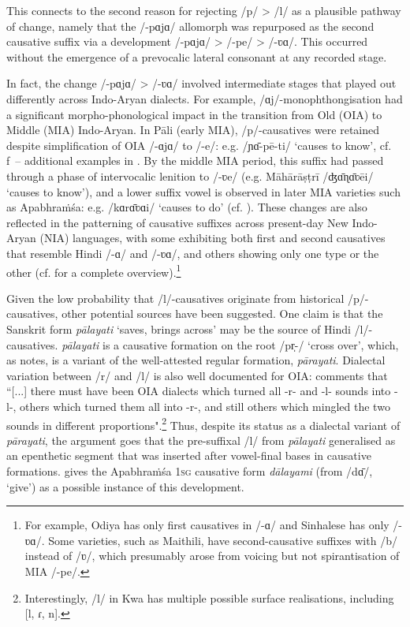 \documentclass[output=paper,colorlinks,citecolor=brown]{langscibook}
\begin{document}
This connects to the second reason for rejecting /p/ > /l/ as a plausible pathway of change, namely that the /-pɑjɑ/ allomorph was repurposed as the second causative suffix via a development /-pɑjɑ/ > /-pe/ > /-ʋɑ/.  This occurred without the emergence of a prevocalic lateral consonant at any recorded stage.  

In fact, the change /-pɑjɑ/ > /-ʋɑ/ involved intermediate stages that played out differently across Indo-Aryan dialects. For example, /ɑj/-monophthongisation had a significant morpho-phonological impact in the transition from Old (OIA) to Middle (MIA) Indo-Aryan.  In Pāli (early MIA), /p/-causatives were retained despite simplification of OIA /-ɑjɑ/ to /-e/: e.g. /ɲɑ̄-pē-ti/ `causes to know', cf. f~-- additional examples in \citet[§52]{Oberlies2001}.  By the middle MIA period, this suffix had passed through a phase of intervocalic lenition to /-ʋe/ (e.g. Māhārāṣṭrī /ʤɑ̄ɳɑ̄ʋēi/ `causes to know'), and a lower suffix vowel is observed in later MIA varieties such as Apabhraṁśa: e.g. /kɑrɑ̄ʋɑi/ `causes to do' (cf. \citealt[230]{Bubenik2003}).  These changes are also reflected in the patterning of causative suffixes across present-day New Indo-Aryan (NIA) languages, with some exhibiting both first and second causatives that resemble Hindi /-ɑ/ and /-ʋɑ/, and others showing only one type or the other (cf. \citealt[§9.6]{Masica1991} for a complete overview).\footnote{For example, Odiya has only first causatives in /-ɑ/ and Sinhalese has only /-ʋɑ/.  Some varieties, such as Maithili, have second-causative suffixes with /b/ instead of /ʋ/, which presumably arose from voicing but not spirantisation of MIA /-pe/.} 

Given the low probability that /l/-causatives originate from historical /p/\hyp causatives, other potential sources have been suggested.  One claim is that the Sanskrit form \textit{pālayati} `saves, brings across' may be the source of Hindi /l/-causatives.  \textit{pālayati} is a causative formation on the root /pr̩-/ `cross over', which, as \citet[85]{Jamison1983} notes, is a variant of the well-attested regular formation, \textit{pārayati}.  Dialectal variation between /r/ and /l/ is also well documented for OIA: \citet[280]{Norman2012} comments that ``[...] there must have been OIA dialects which turned all -r- and -l- sounds into -l-, others which turned them all into -r-, and still others which mingled the two sounds in different proportions".\footnote{Interestingly, /l/ in Kwa  has multiple possible surface realisations, including [l, ɾ, n].}  Thus, despite its status as a dialectal variant of \textit{pārayati}, the argument goes that the pre-suffixal /l/ from \textit{pālayati} generalised as an epenthetic segment that was inserted after vowel-final bases in causative formations.  \citet[§156]{Sen1960} gives the Apabhraṁśa 1\textsc{sg} causative form \textit{dālayami} (from /d\=ɑ/, `give') as a possible instance of this development.  
\end{document}
